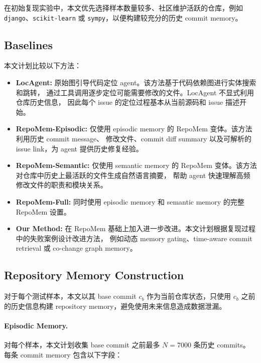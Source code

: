 在初始复现实验中，本文优先选择样本数量较多、社区维护活跃的仓库，例如
\texttt{django}、\texttt{scikit-learn} 或 \texttt{sympy}，以便构建较充分的历史 commit memory。

\subsection{Baselines}
\label{subsec:baselines}

本文计划比较以下方法：

\begin{itemize}
    \item \textbf{LocAgent:}
    原始图引导代码定位 agent。该方法基于代码依赖图进行实体搜索和跳转，
    通过工具调用逐步定位可能需要修改的文件。LocAgent 不显式利用仓库历史信息，
    因此每个 issue 的定位过程基本从当前源码和 issue 描述开始。

    \item \textbf{RepoMem-Episodic:}
    仅使用 episodic memory 的 RepoMem 变体。该方法利用历史 commit message、
    修改文件、commit diff summary 以及可解析的 issue link，为 agent 提供历史修复经验。

    \item \textbf{RepoMem-Semantic:}
    仅使用 semantic memory 的 RepoMem 变体。该方法对仓库中历史上最活跃的文件生成自然语言摘要，
    帮助 agent 快速理解高频修改文件的职责和模块关系。

    \item \textbf{RepoMem-Full:}
    同时使用 episodic memory 和 semantic memory 的完整 RepoMem 设置。

    \item \textbf{Our Method:}
    在 RepoMem 基础上加入进一步改进。本文计划根据复现过程中的失败案例设计改进方法，
    例如动态 memory gating、time-aware commit retrieval 或 co-change graph memory。
\end{itemize}

\subsection{Repository Memory Construction}
\label{subsec:memory_construction}

对于每个测试样本，本文以其 base commit $c_b$ 作为当前仓库状态，只使用
$c_b$ 之前的历史信息构建 repository memory，避免使用未来信息造成数据泄漏。

\paragraph{Episodic Memory.}
对每个样本，本文计划收集 base commit 之前最多 $N=7000$ 条历史 commits。
每条 commit memory 包含以下字段：

